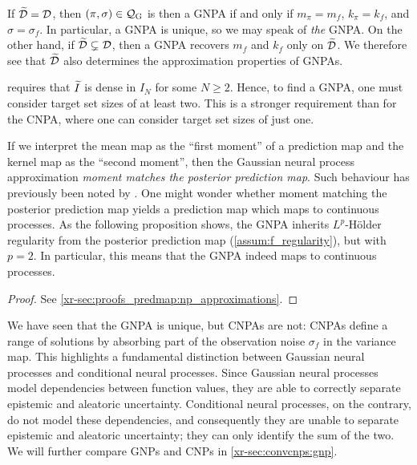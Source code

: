 \documentclass[12pt, twoside]{report}
\newcommand{\xrprefix}[1]{xr-#1}
\begin{document}
If $\widetilde{\mathcal{D}} = \mathcal{D}$,
then $(\pi, \sigma) \in \Qc\ss{G}$ is then a GNPA if and only if $m_{\pi} = m_f$, $k_{\pi} = k_f$, and $\sigma = \sigma_f$.
In particular, a GNPA is unique, so we may speak of \emph{the} GNPA.
On the other hand, if $\widetilde{\mathcal{D}} \subsetneq \mathcal{D}$, then a GNPA recovers $m_f$ and $k_f$ only on $\widetilde{\mathcal{D}}$.
We therefore see that $\widetilde{\mathcal{D}}$ also determines the approximation properties of GNPAs.

 requires that $\widetilde{I}$ is dense in $I_N$ for some $N \ge 2$.
Hence, to find a GNPA, one must consider target set sizes of at least two.
This is a stronger requirement than for the CNPA, where one can consider target set sizes of just one.

If we interpret the mean map as the ``first moment'' of a prediction map and the kernel map as the ``second moment'', then the Gaussian neural process approximation \emph{moment matches the posterior prediction map}.
Such behaviour has previously been noted by \textcite{Ma:2018:Variational_Implicit_Processes}.
One might wonder whether moment matching the posterior prediction map yields a prediction map which maps to continuous processes.
As the following proposition shows, the GNPA inherits $L^p$-H\"older regularity from the posterior prediction map (\cref{assum:f_regularity}), but with $p = 2$.
In particular, this means that the GNPA indeed maps to continuous processes.

\begingroup
    \newcommand{\possibleprefix}[1]{#1}
\endgroup

\begin{proof}
    See \cref{\xrprefix{sec:proofs_predmap:np_approximations}}.
\end{proof}

We have seen that the GNPA is unique, but CNPAs are not:
CNPAs define a range of solutions by absorbing part of the observation noise $\sigma_f$ in the variance map.
This highlights a fundamental distinction between Gaussian neural processes and conditional neural processes.
Since Gaussian neural processes model dependencies between function values, they are able to correctly separate epistemic and aleatoric uncertainty.
Conditional neural processes, on the contrary, do not model these dependencies, and consequently they are unable to separate epistemic and aleatoric uncertainty;
they can only identify the sum of the two.
We will further compare GNPs and CNPs in \cref{\xrprefix{sec:convcnps:gnp}}.
\end{document}
